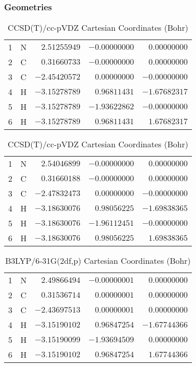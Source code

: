 \documentclass[10pt,oneside]{article}
\begin{document}
\clearpage

\subsection{}

\begin{table}[h!]
\subsubsection*{Geometries}
\begin{multicols}{2}
\centering
\caption{CCSD(T)/cc-pVTZ Cartesian Coordinates (Bohr)}
\begin{tabular}{llrrr}
\toprule
1  & N  & $ 2.51255949$ & $-0.00000000$ & $ 0.00000000$ \\
2  & C  & $ 0.31660733$ & $-0.00000000$ & $ 0.00000000$ \\
3  & C  & $-2.45420572$ & $ 0.00000000$ & $-0.00000000$ \\
4  & H  & $-3.15278789$ & $ 0.96811431$ & $-1.67682317$ \\
5  & H  & $-3.15278789$ & $-1.93622862$ & $-0.00000000$ \\
6  & H  & $-3.15278789$ & $ 0.96811431$ & $ 1.67682317$ \\
\bottomrule
\end{tabular}
\caption{CCSD(T)/cc-pVDZ Cartesian Coordinates (Bohr)}
\begin{tabular}{llrrr}
\toprule
1  & N  & $ 2.54046899$ & $-0.00000000$ & $ 0.00000000$ \\
2  & C  & $ 0.31660188$ & $-0.00000000$ & $ 0.00000000$ \\
3  & C  & $-2.47832473$ & $ 0.00000000$ & $-0.00000000$ \\
4  & H  & $-3.18630076$ & $ 0.98056225$ & $-1.69838365$ \\
5  & H  & $-3.18630076$ & $-1.96112451$ & $-0.00000000$ \\
6  & H  & $-3.18630076$ & $ 0.98056225$ & $ 1.69838365$ \\
\bottomrule
\end{tabular}
\end{multicols}
\end{table}

\begin{table}[h]
\centering
\caption{B3LYP/6-31G(2df,p) Cartesian Coordinates (Bohr)}
\begin{tabular}{llrrr}
\toprule
1  & N  & $ 2.49866494$ & $-0.00000001$ & $ 0.00000000$ \\
2  & C  & $ 0.31536714$ & $ 0.00000001$ & $ 0.00000000$ \\
3  & C  & $-2.43697513$ & $ 0.00000001$ & $ 0.00000000$ \\
4  & H  & $-3.15190102$ & $ 0.96847254$ & $-1.67744366$ \\
5  & H  & $-3.15190099$ & $-1.93694509$ & $ 0.00000000$ \\
6  & H  & $-3.15190102$ & $ 0.96847254$ & $ 1.67744366$ \\
\bottomrule
\end{tabular}
\end{table}
\end{document}
